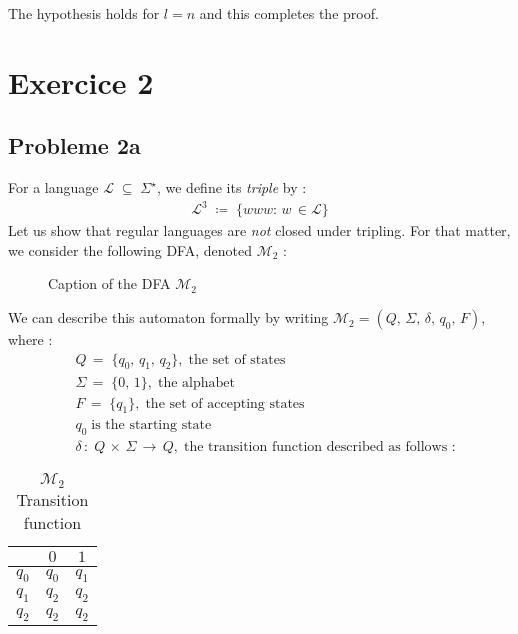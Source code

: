 \documentclass{article}
\begin{document}
The hypothesis holds for $l=n$ and this completes the proof.


\section{Exercice 2}
\subsection{Probleme 2a}
For a language $\mathcal{L}\;\subseteq\;\Sigma^\star$, we define its \textit{triple} by :
\begin{align*}
    \mathcal{L}^3\;\coloneqq\;\{www :\,w\,\in\mathcal{L}\}
\end{align*}
Let us show that regular languages are \textit{not} closed under tripling. For that matter, we consider the following DFA, denoted $\mathcal{M}_2$ :

\begin{figure}[ht] %
\centering %
\caption{Caption of the DFA $\mathcal{M}_2$}
\label{fig:my_label2}
\end{figure}

We can describe this automaton formally by writing $\mathcal{M}_2 = (Q,\, \Sigma,\, \delta,\, q_0,\, F)$, where :
\begin{align*}
    &Q\,=\;\{q_0,\,q_1,\,q_2\},\;\text{the set of states}\\
    &\Sigma\,=\; \{ 0,\, 1 \}, \;\text{the alphabet}\\
    &F\,=\;\{q_1\},\; \text{the set of accepting states}\\
    &q_0\;\text{is the starting state}\\
    &\delta\,:\;Q\,\times\,\Sigma\,\to\,Q,\;\text{the transition function described as follows :}
\end{align*}

\begin{table}[H]
\renewcommand{\arraystretch}{1.25}
    \centering
    \begin{tabular}{|c||c|c|}
         \hline   
         &$0$&$1$  \\\hline\hline
         $q_0$&$q_0$&$q_1$  \\\hline
         $q_1$&$q_2$&$q_2$  \\\hline
         $q_2$&$q_2$&$q_2$  \\\hline
    \end{tabular}
    \caption{$\mathcal{M}_2$\;Transition function}
    \label{tab:my_label2}
\end{table}
\end{document}
